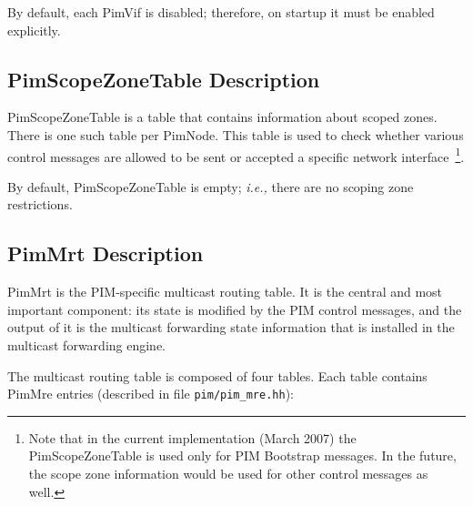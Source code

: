 \documentclass[11pt]{article}
\newcommand{\ie}{\emph{i.e.,}\xspace}
\begin{document}
By default, each PimVif is disabled; therefore, on startup it must be
enabled explicitly. 


\subsection{PimScopeZoneTable Description}

PimScopeZoneTable is a table that contains information about scoped
zones. There is one such table per PimNode. This table is used to check
whether various control messages are allowed to be sent or accepted a
specific network interface~\footnote{Note that in the current implementation
(March 2007) the PimScopeZoneTable is used only for PIM
Bootstrap messages. In the future, the scope zone information would be
used for other control messages as well.}.

By default, PimScopeZoneTable is empty; \ie there are no scoping zone
restrictions.


\subsection{PimMrt Description}

PimMrt is the PIM-specific multicast routing table. It is the central
and most important component: its state is modified by the PIM control
messages, and the output of it is the multicast forwarding state
information that is installed in the multicast forwarding engine.

The multicast routing table is composed of four tables. Each table
contains PimMre entries (described in file \verb=pim/pim_mre.hh=):
\end{document}
